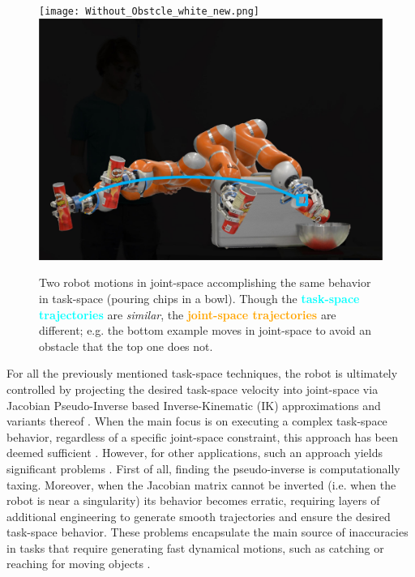 \documentclass[letterpaper, 10 pt, conference,fleqn]{ieeeconf}
\begin{document}
\begin{figure}[t]
\centering
\texttt{[image: Without\_Obstcle\_white\_new.png]}
\includegraphics[scale=.23,trim={0 0 0 9.cm},clip]{With_Obstcle.jpg}
\caption{Two robot motions in joint-space accomplishing the same behavior in task-space (pouring chips in a bowl). Though the \textcolor{cyan}{\textbf{task-space trajectories}} are \textit{similar}, the \textcolor{orange}{\textbf{joint-space trajectories}} are different; e.g. the bottom example moves in joint-space to avoid an obstacle that the top one does not.}
\label{fig:robot_example}
\vspace{-0.6cm}
\end{figure}

For all the previously mentioned task-space techniques, the robot is ultimately controlled by projecting the desired task-space velocity into joint-space via Jacobian Pseudo-Inverse based Inverse-Kinematic (IK) approximations and variants thereof \cite{kelly2006control}. When the main focus is on executing a complex task-space behavior, regardless of a specific joint-space constraint, this approach has been deemed sufficient \cite{figueroa2016HRIrolling,ureche2015taskconst}. However, for other applications, such an approach yields significant problems \cite{buss2004introduction}. First of all, finding the pseudo-inverse is computationally taxing. Moreover, when the Jacobian matrix cannot be inverted (i.e. when the robot is near a singularity) its behavior becomes erratic, requiring layers of additional engineering to generate smooth trajectories and ensure the desired task-space behavior. These problems encapsulate the main source of inaccuracies in tasks that require generating fast dynamical motions, such as catching or reaching for moving objects \cite{7439839,Salehian-RSS-16}. 
\end{document}
